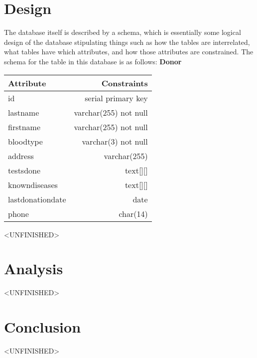 \documentclass[runningheads,a4paper]{llncs}
\begin{document}
\section{Design}\label{sec:design}
The database itself is described by a schema, which is essentially some logical design of the database stipulating things such as how the tables are interrelated, what tables have which attributes, and how those attributes are constrained. The schema for the table in this database is as follows:
\newline
\textbf{Donor}
\newline
\begin{tabular}{| l | r |}
  \hline
  Attribute & Constraints \\
  \hline
  id & serial primary key \\
  lastname & varchar(255) not null \\
  firstname & varchar(255) not null \\
  bloodtype & varchar(3) not null \\
  address & varchar(255) \\
  testsdone & text[][] \\
  knowndiseases & text[][] \\
  lastdonationdate & date \\
  phone & char(14) \\
  \hline
\end{tabular}

<UNFINISHED>

\section{Analysis}\label{sec:analysis}
<UNFINISHED>
\section{Conclusion}\label{sec:conc}
<UNFINISHED>

\end{document}
